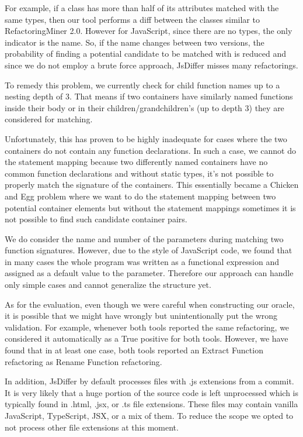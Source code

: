 \documentclass[letterpaper,12pt,onecolumn,final]{report}
\begin{document}
For example, if a class has more than half of its attributes matched with the same types, then our tool performs a diff between the classes similar to RefactoringMiner 2.0. However for JavaScript, since there are no types, the only indicator is the name. So, if the name changes between two versions, the probability of finding a potential candidate to be matched with is reduced and since we do not employ a brute force approach, JsDiffer misses many refactorings.


To remedy this problem, we currently check for child function names up to a nesting depth of 3. That means if two containers have similarly named functions inside their body or in their children/grandchildren's (up to depth 3) they are considered for matching.

Unfortunately, this has proven to be highly inadequate for cases where the two containers do not contain any function declarations. In such a case, we cannot do the statement mapping because two differently named containers have no common function declarations and without static types, it's not possible to properly match the signature of the containers. This essentially became a Chicken and Egg problem where we want to do the statement mapping between two potential container elements but without the statement mappings sometimes it is not possible to find such candidate container pairs.

We do consider the name and number of the parameters during matching two function signatures. However,  due to the style of JavaScript code, we found that in many cases the whole program was written as a functional expression and assigned as a default value to the parameter. Therefore our approach can handle only simple cases and cannot generalize the structure yet.

As for the evaluation, even though we were careful when constructing our oracle, it is possible that we might have wrongly but unintentionally put the wrong validation. For example, whenever both tools reported the same refactoring, we considered it automatically as a True positive for both tools. However, we have found that in at least one case, both tools reported an Extract Function refactoring as Rename Function refactoring.

In addition, JsDiffer by default processes files with .js extensions from a commit. It is very likely that a huge portion of the source code is left unprocessed which is typically found in .html, .jsx, or .ts file extensions. These files may contain vanilla JavaScript, TypeScript, JSX, or a mix of them. To reduce the scope we opted to not process other file extensions at this moment.
\end{document}
